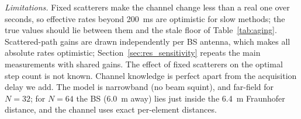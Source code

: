 \emph{Limitations.} Fixed scatterers make the channel change less than a real one over seconds, so effective rates beyond 200~ms are optimistic for slow methods; the true values should lie between them and the stale floor of Table~\ref{tab:aging}. Scattered-path gains are drawn independently per BS antenna, which makes all absolute rates optimistic; Section~\ref{sec:res_sensitivity} repeats the main measurements with shared gains. The effect of fixed scatterers on the optimal step count is not known. Channel knowledge is perfect apart from the acquisition delay we add. The model is narrowband (no beam squint), and far-field for $N=32$; for $N=64$ the BS (6.0~m away) lies just inside the 6.4~m Fraunhofer distance, and the channel uses exact per-element distances.
